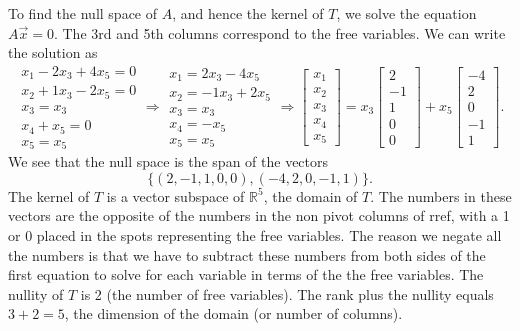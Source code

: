 \begin{example}
To find the null space of $A$, and hence the kernel of $T$, we solve the equation $A\vec x=0$.  The 3rd and 5th columns correspond to the free variables.  We can write the solution as 
$$
\begin{matrix}
x_1-2x_3+4x_5=0\\
x_2+1x_3-2x_5=0\\
x_3=x_3\\
x_4+x_5=0\\
x_5=x_5
\end{matrix}
\Rightarrow
\begin{matrix}
x_1=2x_3-4x_5\\
x_2=-1x_3+2x_5\\
x_3=x_3\\
x_4=-x_5\\
x_5=x_5
\end{matrix}
\Rightarrow
\begin{bmatrix}
x_1\\
x_2\\
x_3\\
x_4\\
x_5
\end{bmatrix}=
x_3
\begin{bmatrix}
2\\
-1\\
1\\
0\\
0
\end{bmatrix}+
x_5
\begin{bmatrix}
-4\\
2\\
0\\
-1\\
1
\end{bmatrix}.
$$
We see that the null space is the span of the vectors $$\{(2,-1,1,0,0),(-4,2,0,-1,1)\}.$$ 
The kernel of $T$ is a vector subspace of ${\mathbb{R}}^5$, the domain of $T$.  
The numbers in these vectors are the opposite of the numbers in the non pivot columns of rref, with a 1 or 0 placed in the spots representing the free variables.  
The reason we negate all the numbers is that we have to subtract these numbers from both sides of the first equation to solve for each variable in terms of the the free variables.  
The nullity of $T$ is 2 (the number of free variables). 
The rank plus the nullity equals $3+2=5$, the dimension of the domain (or number of columns).
\end{example}


